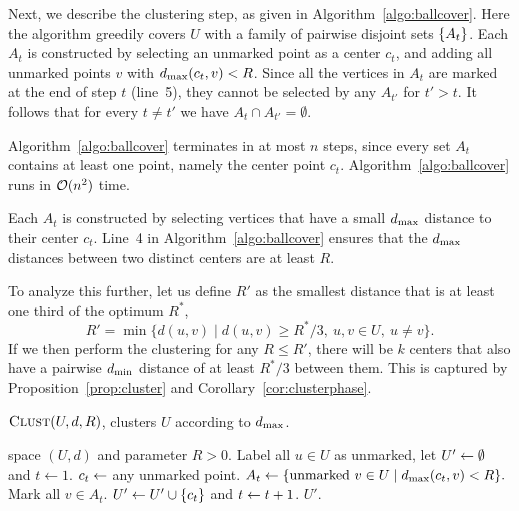 Next, we describe the clustering step, as given in
Algorithm~\ref{algo:ballcover}. Here the algorithm greedily covers $U$ with a family of pairwise disjoint sets $\left\{A_t\right\}$. 
Each $A_t$ is constructed by selecting an unmarked point as a center $c_t$, and adding all unmarked points $v$ with $d_{\text{max}}(c_t, v) < R$. Since all the vertices in $A_t$ are marked at the end of step $t$ (line~5), they cannot be selected by any $A_{t'}$ for $t' > t$. It follows that for every $t \neq t'$ we have $A_t \cap A_{t'} = \emptyset$. 

Algorithm~\ref{algo:ballcover} terminates in at most $n$ steps, since every set $A_t$ contains at least one point, namely the center point $c_t$. Algorithm~\ref{algo:ballcover} runs in $\mathcal{O}(n^2)$ time.


Each $A_t$ is constructed by selecting vertices that have a small $d_{\text{max}}$ distance to their center $c_t$. Line~4 in Algorithm~\ref{algo:ballcover} ensures that the $d_{\text{max}}$ distances between two distinct centers are at least $R$. 

To analyze this further, let us define $R'$ as the smallest distance that is at least one third of the optimum $R^*$,
\begin{equation}
\label{def:R'}
R' = \min\{d(u,v) \mid d(u,v) \geq R^*/3, \ u,v \in U, \ u\neq v\}.
\end{equation}
If we then perform the clustering for any $R \leq R'$, there will be $k$ centers that also have a pairwise $d_{\text{min}}$ distance of at least $R^*/3$ between them. This is captured by Proposition~\ref{prop:cluster} and Corollary~\ref{cor:clusterphase}.

\begin{algorithm}[t]
\caption{$\algclust{U, d, R}$, clusters $U$ according to $d_{\text{max}}$.}\label{algo:ballcover} 
\begin{algorithmic}[1]
\Require space $(U, d)$ and parameter $R > 0$.
\State Label all $u \in U$ as unmarked, let ${U}' \leftarrow \emptyset$ and  $t \leftarrow 1$.
	\State $c_t \leftarrow $ any unmarked point.
	\State $A_t \leftarrow \{\text{unmarked } v \in U \mid d_{\text{max}}(c_t,v) < R \}.$ 
	\State Mark all $v \in A_t$. 
	\State ${U}' \leftarrow {U}' \cup \{c_t\}$ and $t \leftarrow t+1$.
\EndWhile
\Ensure ${U}'.$
\end{algorithmic}
\end{algorithm}

